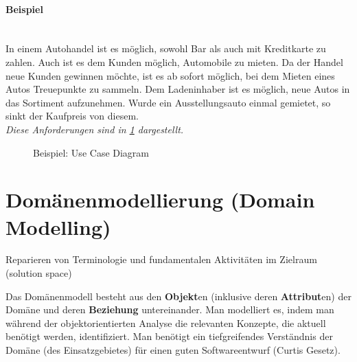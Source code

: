 \documentclass[
    ngerman,
    color=3b,
    summary,
    boxarc,
    main,
]{rubos-tuda-template}
\begin{document}
\paragraph{Beispiel}\mbox{}\\
In einem Autohandel ist es möglich, sowohl Bar als auch mit Kreditkarte zu zahlen. Auch ist es dem Kunden möglich, Automobile zu mieten. Da der Handel neue Kunden gewinnen möchte, ist es ab sofort möglich, bei dem Mieten eines Autos Treuepunkte zu sammeln. Dem Ladeninhaber ist es möglich, neue Autos in das Sortiment aufzunehmen. Wurde ein Ausstellungsauto einmal gemietet, so sinkt der Kaufpreis von diesem. \\ \textit{Diese Anforderungen sind in \figurename{} \ref{fig:usecase} dargestellt.}
\begin{figure}[ht]
    \centering
    \caption{Beispiel: Use Case Diagram}
    \label{fig:usecase}
\end{figure}

\FloatBarrier{}
\section{Domänenmodellierung (Domain Modelling)}
\begin{definition}
    Reparieren von Terminologie und fundamentalen Aktivitäten im Zielraum (solution space)
\end{definition}
\begin{definition}
    Das Domänenmodell besteht aus den \textbf{Objekt}en (inklusive deren \textbf{Attribut}en) der Domäne und deren  \textbf{Beziehung}  untereinander.
    Man modelliert es, indem man während der objektorientierten Analyse die relevanten Konzepte, die aktuell benötigt werden, identifiziert. Man benötigt ein tiefgreifendes Verständnis der Domäne (des Einsatzgebietes) für einen guten Softwareentwurf (Curtis Gesetz).
\end{definition}
\end{document}
